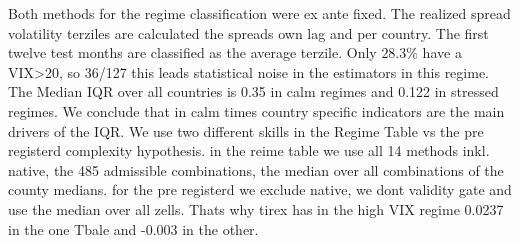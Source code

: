 Both methods for the regime classification were ex ante fixed. The realized spread volatility terziles are calculated the spreads own lag and per country. The first twelve test months are classified as the average terzile. Only $28.3\%$ have a VIX>20, so 36/127 this leads statistical noise in the estimators in this regime. The Median IQR over all countries is 0.35 in calm regimes and 0.122 in stressed regimes. We conclude that in calm times country specific indicators are the main drivers of the IQR. We use two different skills in the Regime Table vs the pre registerd complexity hypothesis. in the reime table we use all 14 methods inkl. native, the 485 admissible combinations, the median over all combinations of the county medians. for the pre registerd we exclude native, we dont validity gate and use the median over all zells. Thats why tirex has in the high VIX regime 0.0237 in the one Tbale and -0.003 in the other.
%
